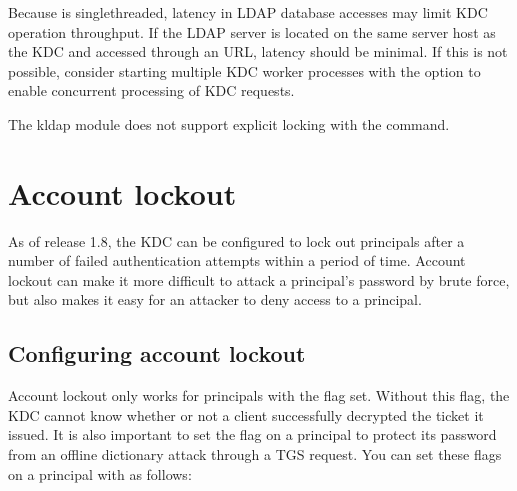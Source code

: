 \documentclass[letterpaper,10pt,english]{sphinxmanual}
\begin{document}
\sphinxAtStartPar
Because {\hyperref[\detokenize{admin/admin_commands/krb5kdc:krb5kdc-8}]{}} is single\sphinxhyphen{}threaded, latency in LDAP database
accesses may limit KDC operation throughput.  If the LDAP server is
located on the same server host as the KDC and accessed through an
 URL, latency should be minimal.  If this is not possible,
consider starting multiple KDC worker processes with the
{\hyperref[\detokenize{admin/admin_commands/krb5kdc:krb5kdc-8}]{}}  option to enable concurrent processing of KDC
requests.

\sphinxAtStartPar
The kldap module does not support explicit locking with the
{\hyperref[\detokenize{admin/admin_commands/kadmin_local:kadmin-1}]{}}  command.


\chapter{Account lockout}
\label{\detokenize{admin/lockout:account-lockout}}\label{\detokenize{admin/lockout:lockout}}\label{\detokenize{admin/lockout::doc}}
\sphinxAtStartPar
As of release 1.8, the KDC can be configured to lock out principals
after a number of failed authentication attempts within a period of
time.  Account lockout can make it more difficult to attack a
principal’s password by brute force, but also makes it easy for an
attacker to deny access to a principal.


\section{Configuring account lockout}
\label{\detokenize{admin/lockout:configuring-account-lockout}}
\sphinxAtStartPar
Account lockout only works for principals with the
 flag set.  Without this flag, the KDC cannot
know whether or not a client successfully decrypted the ticket it
issued.  It is also important to set the  flag on a
principal to protect its password from an off\sphinxhyphen{}line dictionary attack
through a TGS request.  You can set these flags on a principal with
{\hyperref[\detokenize{admin/admin_commands/kadmin_local:kadmin-1}]{}} as follows:

\begin{sphinxVerbatim}[commandchars=\\\{\}]
    
\end{sphinxVerbatim}
\end{document}
